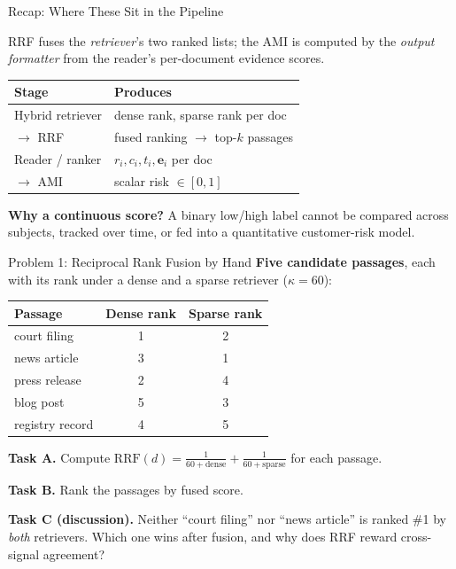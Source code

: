 \documentclass[9pt,t]{beamer}
\begin{document}
\begin{frame}{Recap: Where These Sit in the Pipeline}
\begin{underhood}
RRF fuses the \emph{retriever}'s two ranked lists; the AMI is computed by the
\emph{output formatter} from the reader's per-document evidence scores.
\end{underhood}

\medskip
\begin{tabular}{ll}
\toprule
\textbf{Stage} & \textbf{Produces} \\
\midrule
Hybrid retriever & dense rank, sparse rank per doc \\
$\to$ RRF & fused ranking $\to$ top-$k$ passages \\
Reader / ranker & $r_i, c_i, t_i, \mathbf{e}_i$ per doc \\
$\to$ AMI & scalar risk $\in [0,1]$ \\
\bottomrule
\end{tabular}

\medskip
\textbf{Why a continuous score?} A binary low/high label cannot be compared across
subjects, tracked over time, or fed into a quantitative customer-risk model.
\end{frame}

\begin{frame}{Problem 1: Reciprocal Rank Fusion by Hand}
\textbf{Five candidate passages}, each with its rank under a dense and a sparse
retriever ($\kappa = 60$):

\medskip
\begin{tabular}{lcc}
\toprule
\textbf{Passage} & \textbf{Dense rank} & \textbf{Sparse rank} \\
\midrule
court filing    & 1 & 2 \\
news article    & 3 & 1 \\
press release   & 2 & 4 \\
blog post       & 5 & 3 \\
registry record & 4 & 5 \\
\bottomrule
\end{tabular}

\medskip
\textbf{Task A.} Compute $\mathrm{RRF}(d) = \frac{1}{60+\text{dense}} +
\frac{1}{60+\text{sparse}}$ for each passage.

\textbf{Task B.} Rank the passages by fused score.

\textbf{Task C (discussion).} Neither ``court filing'' nor ``news article'' is
ranked \#1 by \emph{both} retrievers. Which one wins after fusion, and why does
RRF reward cross-signal agreement?
\end{frame}
\end{document}
